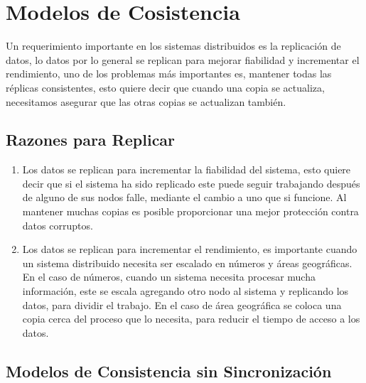 
\chapter{Modelos de Cosistencia} %

\label{ch:modelos_consistencia} %

Un requerimiento importante en los sistemas distribuidos es la replicación de datos, lo datos por lo general se replican para mejorar fiabilidad y incrementar el rendimiento, uno de los problemas más importantes es, mantener todas las réplicas consistentes, esto quiere decir que cuando una copia se actualiza, necesitamos asegurar que las otras copias se actualizan también.  


\section{Razones para Replicar}

\begin{enumerate}
\item Los datos se replican para incrementar la fiabilidad del sistema, esto quiere decir que si el sistema ha sido replicado este puede seguir trabajando después de alguno de sus nodos falle, mediante el cambio a uno que si funcione. Al mantener muchas copias es posible proporcionar una mejor protección contra datos corruptos. 
\item Los datos se replican para incrementar el rendimiento, es importante cuando un sistema distribuido necesita ser escalado en números y áreas geográficas. En el caso de números, cuando un sistema necesita procesar mucha información, este se escala agregando otro nodo al sistema y replicando los datos, para dividir el trabajo. En el caso de área geográfica se coloca una copia cerca del proceso que lo necesita, para reducir el tiempo de acceso a los datos.

\end{enumerate}


\section{Modelos de Consistencia sin Sincronización}

